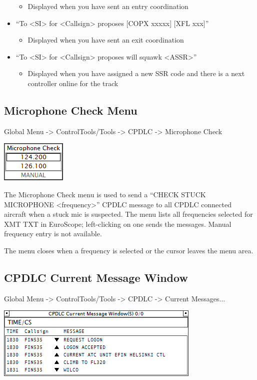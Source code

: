 \documentclass[11pt,a4paper,oldfontcommands]{memoir}
\begin{document}
\begin{itemize}
        \begin{itemize}
             \item Displayed when you have sent an entry coordination
        \end{itemize}
    \item“To <SI> for <Callsign> proposes [COPX xxxxx] [XFL xxx]”
        \begin{itemize}
             \item Displayed when you have sent an exit coordination
        \end{itemize}
    \item“To <SI> for <Callsign> proposes will squawk <ASSR>”
        \begin{itemize}
             \item Displayed when you have assigned a new SSR code and there is a next controller online for the track
        \end{itemize}
\end{itemize}
    
\subsection{Microphone Check Menu}
\label{menu:dlmcm}

Global Menu -> ControlTools/Tools -> CPDLC -> Microphone Check

\includegraphics{img/dlmicchk.png}

The Microphone Check menu is used to send a “CHECK STUCK MICROPHONE <frequency>” CPDLC message to all CPDLC connected aircraft when a stuck mic is suspected. The menu lists all frequencies selected for XMT TXT in EuroScope; left-clicking on one sends the messages. Manual frequency entry is not available.

The menu closes when a frequency is selected or the cursor leaves the menu area.

\subsection{CPDLC Current Message Window}
\label{win:dlcmw}

Global Menu -> ControlTools/Tools -> CPDLC -> Current Messages...

\includegraphics{img/dlcmw.png}
\end{document}
